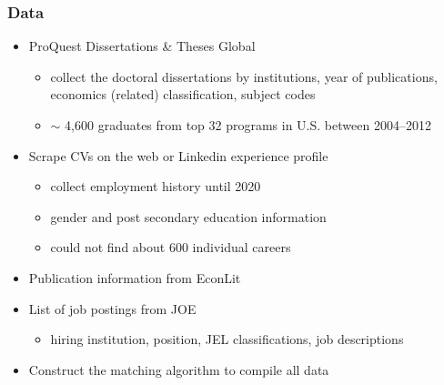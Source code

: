 \documentclass[11pt]{beamer}
\begin{document}
\begin{frame}[label=Data]
	\frametitle{Data}
		\begin{itemize}
			\item ProQuest Dissertations \& Theses Global
			\begin{itemize}
				\item collect the doctoral dissertations by institutions, year of publications, economics (related) classification, subject codes
				\item $\sim$ 4,600 graduates from top 32 programs in U.S. between 2004--2012 
			\end{itemize}
		\vspace{1 mm}				
			\item Scrape CVs on the web or Linkedin experience profile
			\begin{itemize}
				\item collect employment history until 2020
				\item gender and post secondary education information
				\item could not find about 600 individual careers
			\end{itemize}
			\item Publication information from EconLit
			\item List of job postings from JOE
\begin{itemize}
	\item hiring institution, position, JEL classifications, job descriptions  
\end{itemize}		

	\vspace{1 mm}
		\item Construct the matching algorithm to compile all data  \hyperlink{appendix}{}
	\end{itemize}
\end{frame}
\end{document}
